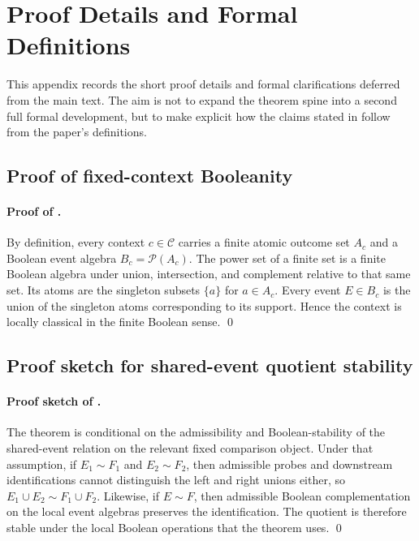\documentclass[11pt]{article}
\newcommand{\CtxFamily}{\mathcal{C}}
\newcommand{\BoolAlg}[1]{B_{#1}}
\newcommand{\SharedEventEq}{\sim}
\theoremstyle{definition}
\begin{document}
\appendix

\section{Proof Details and Formal Definitions}\label{app:proofs}
This appendix records the short proof details and formal clarifications deferred from the main text. The aim is not to expand the theorem spine into a second full formal development, but to make explicit how the claims stated in  follow from the paper's definitions.

\subsection{Proof of fixed-context Booleanity}

\paragraph{Proof of .}
By definition, every context \(c\in\CtxFamily\) carries a finite atomic outcome set \(A_c\) and a Boolean event algebra \(\BoolAlg{c}=\mathcal P(A_c)\). The power set of a finite set is a finite Boolean algebra under union, intersection, and complement relative to that same set. Its atoms are the singleton subsets \(\{a\}\) for \(a\in A_c\). Every event \(E\in\BoolAlg{c}\) is the union of the singleton atoms corresponding to its support. Hence the context is locally classical in the finite Boolean sense. \qed

\subsection{Proof sketch for shared-event quotient stability}

\paragraph{Proof sketch of .}
The theorem is conditional on the admissibility and Boolean-stability of the shared-event relation on the relevant fixed comparison object. Under that assumption, if \(E_1\SharedEventEq F_1\) and \(E_2\SharedEventEq F_2\), then admissible probes and downstream identifications cannot distinguish the left and right unions either, so \(E_1\cup E_2\SharedEventEq F_1\cup F_2\). Likewise, if \(E\SharedEventEq F\), then admissible Boolean complementation on the local event algebras preserves the identification. The quotient is therefore stable under the local Boolean operations that the theorem uses. \qed
\end{document}
